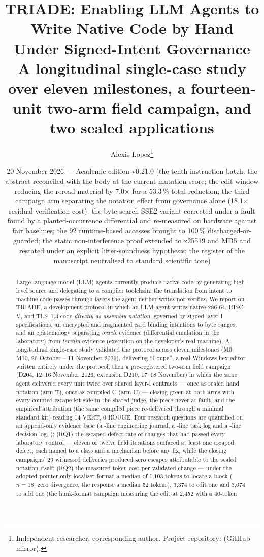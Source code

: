 \documentclass[11pt,a4paper]{article}
\title{\textbf{TRIADE: Enabling LLM Agents to Write Native Code by Hand\\
Under Signed-Intent Governance\\
\large A longitudinal single-case study over eleven milestones, a
fourteen-unit two-arm field campaign, and two sealed applications}}
\author{Alexis Lopez\thanks{Independent researcher; corresponding author.
Project repository: \code{alexisfrlopez-debug/triade} (GitHub mirror).}}
\date{20 November 2026 — Academic edition v0.21.0 (the tenth instruction batch: the abstract reconciled with the body at the current mutation score; the edit window reducing the reread material by 7.0$\times$ for a 53.3\,\% total reduction; the third campaign arm separating the notation effect from governance alone (18.1$\times$ residual verification cost); the byte-search SSE2 variant corrected under a fault found by a planted-occurrence differential and re-measured on hardware against fair baselines; the 92 runtime-based accesses brought to 100\,\% discharged-or-guarded; the static non-interference proof extended to x25519 and MD5 and restated under an explicit lifter-soundness hypothesis; the register of the manuscript neutralised to standard scientific tone)}
\begin{document}
\maketitle
\thispagestyle{fancy}

\begin{abstract}
\noindent Large language model (LLM) agents currently produce native code by
generating high-level source and delegating to a compiler toolchain; the
translation from intent to machine code passes through layers the agent
neither writes nor verifies. We report on TRIADE, a development protocol in
which an LLM agent writes native x86-64, RISC-V, and TLS~1.3 code
\emph{directly as assembly notation}, governed by signed layer-I
specifications, an encrypted and fragmented card binding intentions to byte
ranges, and an epistemology separating \emph{oracle} evidence (differential
emulation in the laboratory) from \emph{terrain} evidence (execution on the
developer's real machine). A longitudinal single-case study validated the
protocol across eleven milestones (M0--M10, 26 October -- 11 November 2026),
delivering ``Loupe'', a real Windows hex-editor written entirely under the
protocol, then a pre-registered two-arm field campaign (D204, 12--16
November 2026; extension D210, 17--18 November) in which the same agent
delivered every unit twice over shared layer-I contracts --- once as sealed
hand notation (arm T), once as compiled C (arm C) --- closing green at both
arms with every counted escape kit-side in the shared judge, the piece
never at fault, and the empirical attribution (the same compiled piece
re-delivered through a minimal standard kit) reading 14 VERT, 0 ROUGE.
Four research questions are quantified on an append-only evidence base
(a \nbLignesJournal-line engineering journal, a \nbLignesWorklog-line
task log and a \nbLignesDecisions-line decision log, \plageDecisions):
(RQ1) the escaped-defect rate of changes that had passed every laboratory
control --- eleven of twelve field iterations surfaced at least one escaped
defect, each named to a class and a mechanism before any fix, while the
closing campaigns' 29 witnessed deliveries produced zero escapes
attributable to the sealed notation itself; (RQ2) the measured token cost
per validated change --- under the adopted pointer-only localiser format a
median of 1{,}103 tokens to locate a block ($n{=}18$, zero divergence, the
response a median 52 tokens), 3{,}374 to edit one and 3{,}674 to add one
(the hunk-format campaign measuring the edit at 2{,}452 with a 40-token

\end{abstract}
\end{document}

